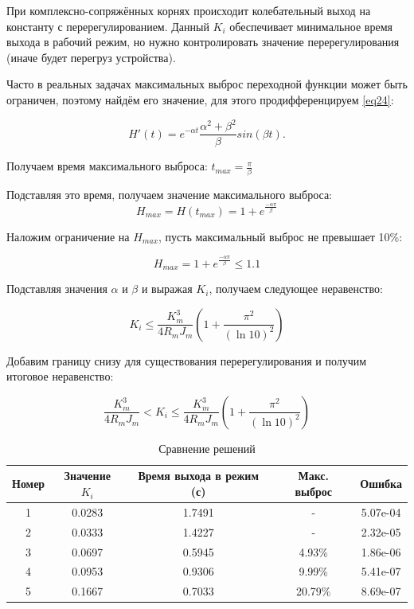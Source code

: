 \documentclass[12pt,a4paper]{extarticle}
\begin{document}
\begin{itemize}
		При комплексно-сопряжённых корнях происходит колебательный выход на константу с перерегулированием. Данный $K_i$ обеспечивает минимальное время выхода в рабочий режим, но нужно контролировать значение перерегулирования (иначе будет перегруз устройства).
		
		Часто в реальных задачах максимальных выброс переходной функции может быть ограничен, поэтому найдём его значение, для этого продифференцируем \ref{eq24}:
		
		\begin{equation}
			H'(t)=e^{-\alpha t} \frac{\alpha^2 + \beta^2}{\beta}sin(\beta t).
		\end{equation}
		
		Получаем время максимального выброса: $t_{max} = \frac{\pi}{\beta}$
		
		Подставляя это время, получаем значение максимального выброса: 
		\begin{equation}
			H_{max} = H(t_{max}) = 1 + e^{\frac{-\alpha\pi}{\beta}}
		\end{equation}
		
		Наложим ограничение на $H_{max}$, пусть максимальный выброс не превышает 10\%:
		
		\begin{equation}
			H_{max} = 1 + e^{\frac{-\alpha\pi}{\beta}} \leq 1.1
		\end{equation}
		
		Подставляя значения $\alpha$ и $\beta$ и выражая $K_i$, получаем следующее неравенство:
		
		\begin{equation}
			K_i \le \frac{K_m^3}{4 R_m J_m} \left( 1 + \frac{\pi^2}{(\ln 10)^2} \right)
		\end{equation}
		
		Добавим границу снизу для существования перерегулирования и получим итоговое неравенство:
		
		\begin{equation}
			\frac{K_m^3}{4 R_m J_m} < K_i \le \frac{K_m^3}{4 R_m J_m} \left( 1 + \frac{\pi^2}{(\ln 10)^2} \right)
			\label{eq29}
		\end{equation}
		
	\end{itemize}
	
	
		\begin{table}[h]
		\centering
		\begin{tabular}{|c|c|c|c|c|}
			\hline
			Номер & Значение $K_i$ & Время выхода в режим (с) & Макс. выброс & Ошибка\\
			\hline
			1 & 0.0283 & 1.7491 & - & 5.07e-04\\
			\hline
			2 & 0.0333 & 1.4227 & - & 2.32e-05\\
			\hline
			3 & 0.0697 & 0.5945 & 4.93\% & 1.86e-06\\
			\hline
			4 & 0.0953 & 0.9306 & 9.99\% & 5.41e-07\\
			\hline
			5 & 0.1667 & 0.7033 & 20.79\% & 8.69e-07\\
			\hline
		\end{tabular}
		\caption{Сравнение решений}
		\label{tab:table1}
	\end{table}
	
\end{document}
